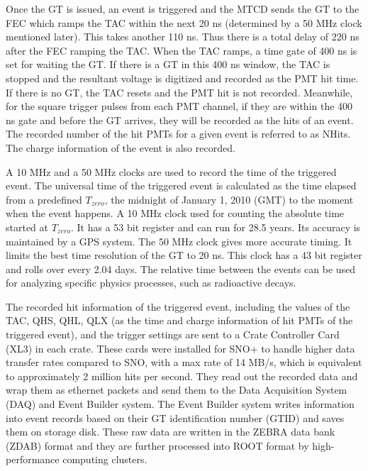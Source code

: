 Once the GT is issued, an event is triggered and the MTCD sends the GT to the FEC which ramps the TAC within the next 20 ns (determined by a 50 MHz clock mentioned later). This takes another 110 ns. Thus there is a total delay of 220 ns after the FEC ramping the TAC. When the TAC ramps, a time gate of 400 ns is set for waiting the GT. If there is a GT in this 400 ns window, the TAC is stopped and the resultant voltage is digitized and recorded as the PMT hit time. If there is no GT, the TAC resets and the PMT hit is not recorded. Meanwhile, for the square trigger pulses from each PMT channel, if they are within the 400 ns gate and before the GT arrives, they will be recorded as the hits of an event. The recorded number of the hit PMTs for a given event is referred to as NHits. The charge information of the event is also recorded\cite{stringer2019sensitivity,rattime}.

A 10 MHz and a 50 MHz clocks are used to record the time of the triggered event. The universal time of the triggered event is calculated as the time elapsed from a predefined $T_{zero}$, the midnight of January 1, 2010 (GMT) to the moment when the event happens. A 10 MHz clock used for counting the absolute time started at $T_{zero}$. It has a 53 bit register and can run for 28.5 years. Its accuracy is maintained by a GPS system. The 50 MHz clock gives more accurate timing. It limits the best time resolution of the GT to 20 ns. This clock has a 43 bit register and rolls over every 2.04 days. The relative time between the events can be used for analyzing specific physics processes, such as radioactive decays\cite{rattime,stringer2019sensitivity}. 

The recorded hit information of the triggered event, including the values of the TAC, QHS, QHL, QLX (as the time and charge information of hit PMTs of the triggered event), and the trigger settings are sent to a Crate Controller Card (XL3) in each crate. These cards were installed for SNO+ to handle higher data transfer rates compared to SNO, with a max rate of 14 MB/s, which is equivalent to approximately 2 million hits per second\cite{bonventre2014neutron}. They read out the recorded data and wrap them as ethernet packets and send them to the Data Acquisition System (DAQ) and Event Builder system\cite{walker2016study}. The Event Builder system writes information into event records based on their GT identification number (GTID) and saves them on storage disk\cite{snop_jinst}. These raw data are written in the ZEBRA data bank (ZDAB) format and they are further processed into ROOT format by high-performance computing clusters.

